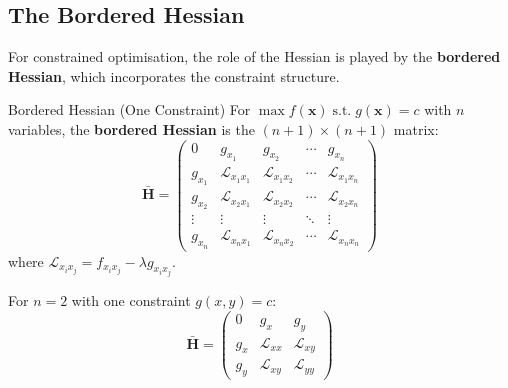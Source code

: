 \documentclass[12pt, a4paper]{article}
\theoremstyle{definition}
\newcommand{\bx}{\mathbf{x}}
\newcommand{\bH}{\mathbf{H}}
\newcommand{\st}{\;\text{s.t.}\;}
\begin{document}
\subsection{The Bordered Hessian}

For constrained optimisation, the role of the Hessian is played by the
\textbf{bordered Hessian}, which incorporates the constraint structure.

\begin{defbox}{Bordered Hessian (One Constraint)}
For $\max f(\bx) \st g(\bx) = c$ with $n$ variables, the
\textbf{bordered Hessian} is the $(n+1)\times(n+1)$ matrix:
\[
  \bar{\bH} =
  \begin{pmatrix}
    0         & g_{x_1} & g_{x_2} & \cdots & g_{x_n} \\
    g_{x_1}   & \mathcal{L}_{x_1 x_1} & \mathcal{L}_{x_1 x_2} & \cdots & \mathcal{L}_{x_1 x_n}\\
    g_{x_2}   & \mathcal{L}_{x_2 x_1} & \mathcal{L}_{x_2 x_2} & \cdots & \mathcal{L}_{x_2 x_n}\\
    \vdots    & \vdots & \vdots & \ddots & \vdots \\
    g_{x_n}   & \mathcal{L}_{x_n x_1} & \mathcal{L}_{x_n x_2} & \cdots & \mathcal{L}_{x_n x_n}
  \end{pmatrix}
\]
where $\mathcal{L}_{x_i x_j} = f_{x_i x_j} - \lambda g_{x_i x_j}$.

For $n=2$ with one constraint $g(x,y)=c$:
\[
  \bar{\bH} =
  \begin{pmatrix}
    0   & g_x & g_y \\
    g_x & \mathcal{L}_{xx} & \mathcal{L}_{xy} \\
    g_y & \mathcal{L}_{xy} & \mathcal{L}_{yy}
  \end{pmatrix}
\]
\end{defbox}
\end{document}
